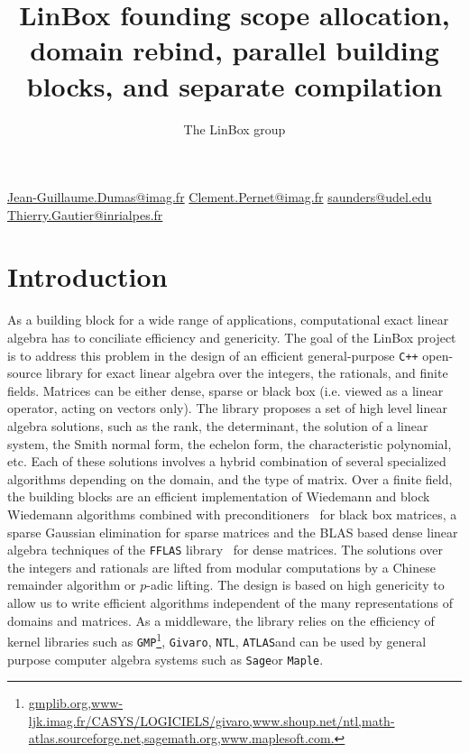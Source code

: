 \documentclass{article}
\newcommand{\linbox}{{\sc LinBox}\xspace}
\begin{document}
\title{\linbox founding scope allocation, domain rebind, parallel building blocks, and
  separate compilation}

\urldef\jgdemail\url{Jean-Guillaume.Dumas@imag.fr}
\urldef\cpemail\url{Clement.Pernet@imag.fr}
\urldef\bdsemail\url{saunders@udel.edu}
\urldef\tgemail\url{Thierry.Gautier@inrialpes.fr}

\author{The LinBox group}
\maketitle
\section{Introduction}
As a building block for a wide range of applications, computational exact linear
algebra has to conciliate efficiency and genericity. The goal of the 
\linbox project is to address this problem in the design of an efficient general-purpose
\texttt{C++} open-source library for exact linear algebra over the integers, the
rationals, and finite fields. 
Matrices can be either dense, sparse or black box (i.e. viewed as a linear
operator, acting on vectors only). The library proposes a set of high level
linear algebra solutions, such as the rank, the determinant, the solution of a
linear system, the Smith normal form, the echelon form, the characteristic
polynomial, etc. Each of these solutions involves a hybrid combination of several specialized
algorithms depending on the domain, and the type of matrix. Over a finite field,
the building blocks are an efficient implementation of Wiedemann and block
Wiedemann algorithms combined with preconditioners~\cite{CEKSTV:2002:EP} for
black box matrices, a sparse Gaussian elimination for sparse matrices and the
BLAS based dense linear algebra techniques of the \texttt{FFLAS}
library~\cite{DGP:2008:dlaff} for dense matrices. The solutions over the integers
and rationals are lifted from modular computations by a Chinese remainder
algorithm or $p$-adic lifting.
The design is based on high genericity to allow us to write efficient algorithms independent of the many 
representations of domains and matrices. As a middleware, the library relies on the
efficiency of kernel libraries such as  \texttt{GMP}\footnote{\url{gmplib.org,www-ljk.imag.fr/CASYS/LOGICIELS/givaro,www.shoup.net/ntl,math-atlas.sourceforge.net,sagemath.org,www.maplesoft.com.}},
\texttt{Givaro}\footnotemark[4],
\texttt{NTL}\footnotemark[4],
\texttt{ATLAS}\footnotemark[4] and can be used by general
purpose computer algebra systems such as \texttt{Sage}\footnotemark[4] or \texttt{Maple}\footnotemark[4].
\end{document}
